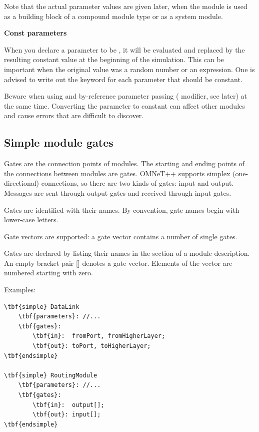 Note that the actual parameter values are given later, when the module
is used as a building block of a compound module type or as a system
module.

\textbf{Const parameters}

When you declare a parameter to be ,
it will be evaluated and replaced by the resulting constant value
at the beginning of the simulation. This can be important when the
original value was a random number or an
expression. One is advised to write out the
 keyword for each parameter that
should be constant.

Beware when using  and by-reference
parameter passing ( modifier, see later)
at the same time. Converting the parameter to constant can affect
other modules and cause errors that are difficult to discover.




\subsection{Simple module gates}
\label{sec:ch-ned-lang:simple-module-gates}


Gates are the connection points of modules. The starting and
ending points of the connections between modules are gates. OMNeT++
supports simplex (one-directional) connections, so there are
two kinds of gates: input and output. Messages are sent through
output gates and received through input gates.

Gates are identified with their names.
By convention, gate names begin with lower-case letters.

Gate vectors are supported: a gate vector
contains a number of single gates.

Gates are declared by listing their names in the
 section of a module description. An
empty bracket pair [] denotes a gate vector.
Elements of the vector are numbered starting with zero.

Examples:

\begin{Verbatim}[commandchars=\\\{\}]
\tbf{simple} DataLink
    \tbf{parameters}: //...
    \tbf{gates}:
        \tbf{in}:  fromPort, fromHigherLayer;
        \tbf{out}: toPort, toHigherLayer;
\tbf{endsimple}

\tbf{simple} RoutingModule
    \tbf{parameters}: //...
    \tbf{gates}:
        \tbf{in}:  output[];
        \tbf{out}: input[];
\tbf{endsimple}
\end{Verbatim}

